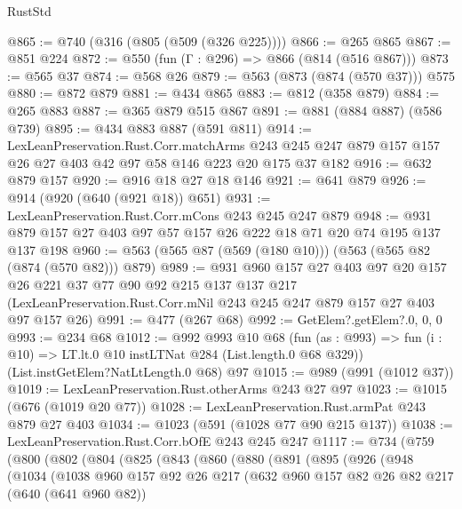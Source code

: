 \begin{lexlean}{RustStd}
\begin{coremodule}
@865 := @740 (@316 (@805 (@509 (@326 @225))))
@866 := @265 @865
@867 := @851 @224
@872 := @550 (fun (Γ : @296) => @866 (@814 (@516 @867)))
@873 := @565 @37
@874 := @568 @26
@879 := @563 (@873 (@874 (@570 @37))) @575
@880 := @872 @879
@881 := @434 @865
@883 := @812 (@358 @879)
@884 := @265 @883
@887 := @365 @879 @515 @867
@891 := @881 (@884 @887) (@586 @739)
@895 := @434 @883 @887 (@591 @811)
@914 := LexLeanPreservation.Rust.Corr.matchArms
    @243
    @245
    @247
    @879
    @157
    @157
    @26
    @27
    @403
    @42
    @97
    @58
    @146
    @223
    @20
    @175
    @37
    @182
@916 := @632 @879 @157
@920 := @916 @18 @27 @18 @146
@921 := @641 @879
@926 := @914 (@920 (@640 (@921 @18)) @651)
@931 := LexLeanPreservation.Rust.Corr.mCons @243 @245 @247 @879
@948 := @931 @879 @157 @27 @403 @97 @57 @157 @26 @222 @18 @71 @20 @74 @195 @137 @137 @198
@960 := @563 (@565 @87 (@569 (@180 @10))) (@563 (@565 @82 (@874 (@570 @82))) @879)
@989 := @931
    @960
    @157
    @27
    @403
    @97
    @20
    @157
    @26
    @221
    @37
    @77
    @90
    @92
    @215
    @137
    @137
    @217
    (LexLeanPreservation.Rust.Corr.mNil @243 @245 @247 @879 @157 @27 @403 @97 @157 @26)
@991 := @477 (@267 @68)
@992 := GetElem?.getElem?.{0, 0, 0}
@993 := @234 @68
@1012 := @992
    @993
    @10
    @68
    (fun (as : @993) => fun (i : @10) => LT.lt.{0} @10 instLTNat @284 (List.length.{0} @68 @329))
    (List.instGetElem?NatLtLength.{0} @68)
    @97
@1015 := @989 (@991 (@1012 @37))
@1019 := LexLeanPreservation.Rust.otherArms @243 @27 @97
@1023 := @1015 (@676 (@1019 @20 @77))
@1028 := LexLeanPreservation.Rust.armPat @243 @879 @27 @403
@1034 := @1023 (@591 (@1028 @77 @90 @215 @137))
@1038 := LexLeanPreservation.Rust.Corr.bOfE @243 @245 @247
@1117 := @734
    (@759
      (@800
        (@802
          (@804
            (@825
              (@843
                (@860
                  (@880
                    (@891
                      (@895
                        (@926
                          (@948
                            (@1034
                              (@1038
                                @960
                                @157
                                @92
                                @26
                                @217
                                (@632
                                  @960
                                  @157
                                  @82
                                  @26
                                  @82
                                  @217
                                  (@640 (@641 @960 @82))

\end{coremodule}
\end{lexlean}
